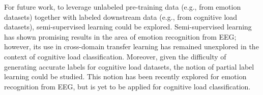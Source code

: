 \documentclass[sigconf]{acmart}
\begin{document}
For future work, to leverage unlabeled pre-training data (e.g., from emotion datasets) together with labeled downstream data (e.g., from cognitive load datasets), semi-supervised learning could be explored. Semi-supervised learning has shown promising results in the area of emotion recognition from EEG; however, its use in cross-domain transfer learning has remained unexplored in the context of cognitive load classification. Moreover, given the difficulty of generating accurate labels for cognitive load datasets, the notion of partial label learning could be studied. This notion has been recently explored for emotion recognition from EEG, but is yet to be applied for cognitive load classification.




\end{document}
